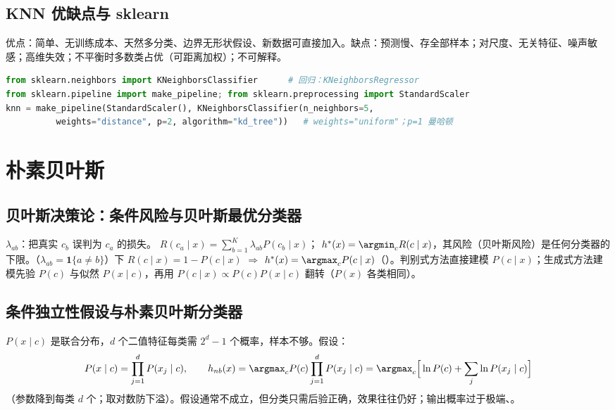\subsection{KNN 优缺点与 sklearn}
优点：简单、无训练成本、天然多分类、边界无形状假设、新数据可直接加入。缺点：预测慢、存全部样本；对尺度、无关特征、噪声敏感；高维失效；不平衡时多数类占优（可距离加权）；不可解释。
\begin{lstlisting}[language=Python,basicstyle=\ttfamily\footnotesize]
from sklearn.neighbors import KNeighborsClassifier      # 回归：KNeighborsRegressor
from sklearn.pipeline import make_pipeline; from sklearn.preprocessing import StandardScaler
knn = make_pipeline(StandardScaler(), KNeighborsClassifier(n_neighbors=5,
          weights="distance", p=2, algorithm="kd_tree"))   # weights="uniform"；p=1 曼哈顿
\end{lstlisting}

\section{朴素贝叶斯}

\subsection{贝叶斯决策论：条件风险与贝叶斯最优分类器}
$\lambda_{ab}$：把真实 $c_b$ 误判为 $c_a$ 的损失。 $R(c_a\mid x)=\sum_{b=1}^K\lambda_{ab}P(c_b\mid x)$； $h^*(x)=\argmin_cR(c\mid x)$，其风险（贝叶斯风险）是任何分类器的下限。（$\lambda_{ab}=\mathbf 1\{a\ne b\}$）下 $R(c\mid x)=1-P(c\mid x)$ $\Rightarrow$ $h^*(x)=\argmax_cP(c\mid x)$（）。判别式方法直接建模 $P(c\mid x)$；生成式方法建模先验 $P(c)$ 与似然 $P(x\mid c)$，再用 $P(c\mid x)\propto P(c)P(x\mid c)$ 翻转（$P(x)$ 各类相同）。

\subsection{条件独立性假设与朴素贝叶斯分类器}
$P(x\mid c)$ 是联合分布，$d$ 个二值特征每类需 $2^d-1$ 个概率，样本不够。假设：
\[
P(x\mid c)=\prod_{j=1}^dP(x_j\mid c),\qquad
h_{nb}(x)=\argmax_c P(c)\prod_{j=1}^dP(x_j\mid c)=\argmax_c\Big[\ln P(c)+\sum_j\ln P(x_j\mid c)\Big]
\]
（参数降到每类 $d$ 个；取对数防下溢）。假设通常不成立，但分类只需后验正确，效果往往仍好；输出概率过于极端、。

